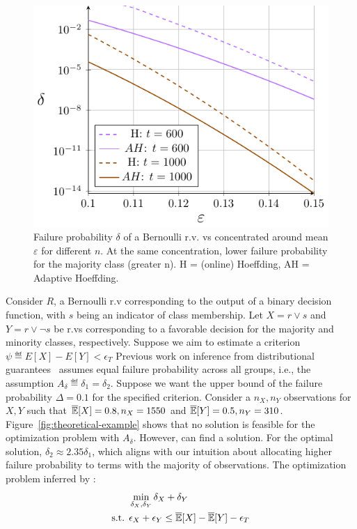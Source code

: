 \begin{figure}
    \centering
    \includegraphics[width=0.75\linewidth]{avoir/images/bernoulli-n-comparison-pgf-tikz}
%        
    \caption{Failure probability $\delta$ of a Bernoulli r.v. vs concentrated around mean $\varepsilon$ for different $n$. At the same concentration, lower failure probability for the majority class (greater n).  H = (online) Hoeffding, AH = Adaptive Hoeffding.}
    \label{fig:n-comparison-hoeffding}
\end{figure}

Consider $R$, a Bernoulli r.v corresponding to the output of a binary decision function, with $s$ being an indicator of class membership. 
Let $X = r \vee s$ and $Y = r \vee \neg s$ be r.vs corresponding to a favorable decision for the majority and minority classes, respectively. 
Suppose we aim to estimate a criterion $\psi \eqdef E[X] - E[Y] < \epsilon_T$
Previous work on inference from distributional guarantees~\cite{albarghouthi2019fairness,bastani2019probabilistic} assumes equal failure probability across all groups, i.e., the assumption $A_\delta \eqdef \delta_1 = \delta_2$.
Suppose we want the upper bound of the failure probability $\Delta = 0.1$ for the specified criterion.
Consider a $n_X, n_Y$ observations for $X, Y$ such that $\overline{\mathbb{E}}[X] = 0.8, n_X = 1550$ and $\overline{\mathbb{E}}[Y] = 0.5, n_Y = 310$.
Figure~\ref{fig:theoretical-example} shows that no solution is feasible for the optimization problem with $A_\delta$.
However, \AVOIRmethodname{} can find a solution.
For the optimal solution, $\delta_2 \approx 2.35\delta_1$, which aligns with our intuition about allocating higher failure probability to terms with the majority of observations. 
The optimization problem inferred by \AVOIRmethodname{}:
\begin{align*}
    \begin{split}
        &\min\limits_{\delta_X, \delta_Y}{\delta_X + \delta_Y} \\
        \text{s.t.  } &\epsilon_X + \epsilon_Y \leq \overline{\mathbb{E}}[X] - \overline{\mathbb{E}}[Y] - \epsilon_T \\
    \end{split}
\end{align*}

